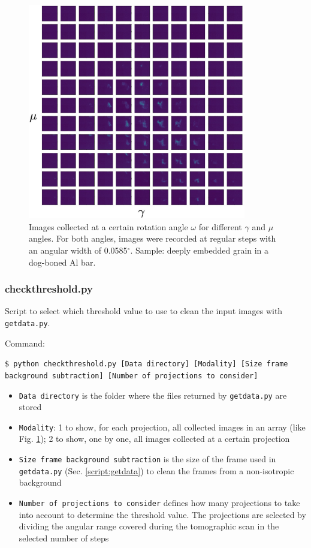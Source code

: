\documentclass[11pt]{scrartcl}
\begin{document}
\begin{figure}[h!]
    \centering
    \includegraphics[width=0.85\textwidth]{Img_one_proj}
    \caption{Images collected at a certain rotation angle $\omega$ for different $\gamma$ and $\mu$ angles. For both angles, images were recorded at regular steps with an angular width of 0.0585$^{\circ}$. Sample: deeply embedded grain in a dog-boned Al bar.}
    \label{fig:all_pics_one_om}
\end{figure}

\subsubsection{check\textunderscore threshold.py}

Script to select which threshold value to use to clean the input images with {\texttt{getdata.py}}.

Command: 

{\texttt{\$ python check\textunderscore threshold.py [Data directory] [Modality] [Size frame background subtraction] [Number of projections to consider]}}

\begin{itemize}
    \item {\texttt{Data directory}} is the folder where the files returned by {\texttt{getdata.py}} are stored
    \item {\texttt{Modality}}: 1 to show, for each projection, all collected images in an array (like Fig. \ref{fig:all_pics_one_om}); 2 to show, one by one, all images collected at a certain projection
    \item {\texttt{Size frame background subtraction}} is the size of the frame used in {\texttt{getdata.py}} (Sec. \ref{script:getdata}) to clean the frames from a non-isotropic background
    \item {\texttt{Number of projections to consider}} defines how many projections to take into account to determine the threshold value. The projections are selected by dividing the angular range covered during the tomographic scan in the selected number of steps
\end{itemize}
\end{document}
